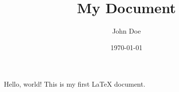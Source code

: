 \documentclass{article}
\title{My Document}
\author{John Doe}
\date{\today}
\begin{document}
\maketitle

Hello, world! This is my first LaTeX document.
\end{document}

